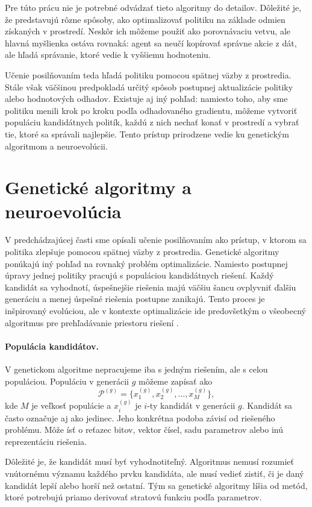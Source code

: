 Pre túto prácu nie je potrebné odvádzať tieto algoritmy do detailov. Dôležité je, že predstavujú rôzne spôsoby, ako optimalizovať politiku na základe odmien získaných v prostredí. Neskôr ich môžeme použiť ako porovnávaciu vetvu, ale hlavná myšlienka ostáva rovnaká: agent sa neučí kopírovať správne akcie z dát, ale hľadá správanie, ktoré vedie k vyššiemu hodnoteniu.

Učenie posilňovaním teda hľadá politiku pomocou spätnej väzby z prostredia. Stále však väčšinou predpokladá určitý spôsob postupnej aktualizácie politiky alebo hodnotových odhadov. Existuje aj iný pohľad: namiesto toho, aby sme politiku menili krok po kroku podľa odhadovaného gradientu, môžeme vytvoriť populáciu kandidátnych politík, každú z nich nechať konať v prostredí a vybrať tie, ktoré sa správali najlepšie. Tento prístup prirodzene vedie ku genetickým algoritmom a neuroevolúcii.

\section{Genetické algoritmy a neuroevolúcia}

V predchádzajúcej časti sme opísali učenie posilňovaním ako prístup, v ktorom sa politika zlepšuje pomocou spätnej väzby z prostredia. Genetické algoritmy ponúkajú iný pohľad na rovnaký problém optimalizácie. Namiesto postupnej úpravy jednej politiky pracujú s populáciou kandidátnych riešení. Každý kandidát sa vyhodnotí, úspešnejšie riešenia majú väčšiu šancu ovplyvniť ďalšiu generáciu a menej úspešné riešenia postupne zanikajú. Tento proces je inšpirovaný evolúciou, ale v kontexte optimalizácie ide predovšetkým o všeobecný algoritmus pre prehľadávanie priestoru riešení \cite{goldberg1989ga}.

\paragraph{Populácia kandidátov.}
V genetickom algoritme nepracujeme iba s jedným riešením, ale s celou populáciou. Populáciu v generácii $g$ môžeme zapísať ako
\[
    \mathcal{P}^{(g)} =
    \{x_1^{(g)}, x_2^{(g)}, \ldots, x_M^{(g)}\},
\]
kde $M$ je veľkosť populácie a $x_i^{(g)}$ je $i$-ty kandidát v generácii $g$. Kandidát sa často označuje aj ako jedinec. Jeho konkrétna podoba závisí od riešeného problému. Môže ísť o reťazec bitov, vektor čísel, sadu parametrov alebo inú reprezentáciu riešenia.

Dôležité je, že kandidát musí byť vyhodnotiteľný. Algoritmus nemusí rozumieť vnútornému významu každého prvku kandidáta, ale musí vedieť zistiť, či je daný kandidát lepší alebo horší než ostatní. Tým sa genetické algoritmy líšia od metód, ktoré potrebujú priamo derivovať stratovú funkciu podľa parametrov.

